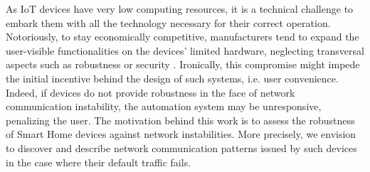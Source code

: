 As IoT devices have very low computing resources,
it is a technical challenge to embark them with all the technology
necessary for their correct operation.
Notoriously, to stay economically competitive,
manufacturers tend to expand the user-visible functionalities
on the devices' limited hardware,
neglecting transversal aspects such as robustness or security \cite{toys,in-the-room}.
Ironically, this compromise might impede the initial incentive behind the design of such systems,
i.e. user convenience.
Indeed, if devices do not provide robustness in the face of network communication
instability, the automation system may be unresponsive,
penalizing the user.
The motivation behind this work is to assess the robustness of Smart Home devices
against network instabilities.
More precisely, we envision to discover and describe network communication patterns issued by such devices
in the case where their default traffic fails.



